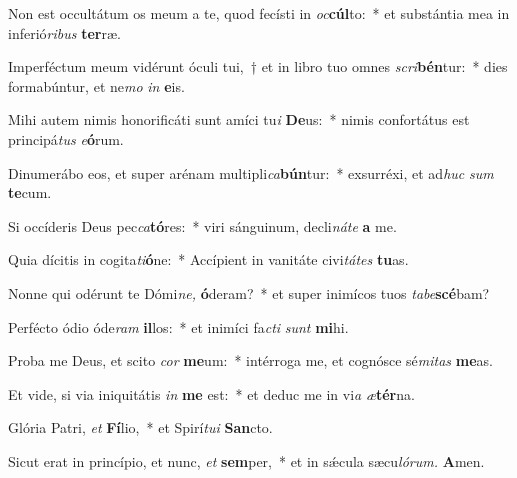 \item Non est occultátum os meum a te, quod fecísti in \textit{oc}\textbf{cúl}to:~* et substántia mea in inferió\textit{ribus} \textbf{ter}ræ.
\item Imperféctum meum vidérunt óculi tui,~† et in libro tuo omnes \textit{scri}\textbf{bén}tur:~* dies formabúntur, et ne\textit{mo} \textit{in} \textbf{e}is.
\item Mihi autem nimis honorificáti sunt amíci tu\hspace{0.03em}\textit{i} \textbf{De}us:~* nimis confortátus est principá\hspace{0.03em}\textit{tus} \textit{e}\textbf{ó}rum.
\item Dinumerábo eos, et super arénam multipli\hspace{0.03em}\textit{ca}\textbf{bún}tur:~* exsurréxi, et ad\textit{huc} \textit{sum} \textbf{te}cum.
\item Si occíderis Deus pec\textit{ca}\textbf{tó}res:~* viri sánguinum, decli\textit{náte} \textbf{a} me.
\item Quia dícitis in cogita\hspace{0.03em}\textit{ti}\textbf{ó}ne:~* Accípient in vanitáte civi\textit{tátes} \textbf{tu}as.
\item Nonne qui odérunt te Dómi\textit{ne,} \textbf{ó}deram?~* et super inimícos tuos \textit{tabe}\textbf{scé}bam?
\item Perfécto ódio óde\textit{ram} \textbf{il}los:~* et inimíci fa\hspace{0.03em}\textit{cti} \textit{sunt} \textbf{mi}hi.
\item Proba me Deus, et scito \textit{cor} \textbf{me}um:~* intérroga me, et cognósce sé\textit{mitas} \textbf{me}as.
\item Et vide, si via iniquitátis \textit{in} \textbf{me} est:~* et deduc me in vi\hspace{0.03em}\textit{a} \textit{æ}\textbf{tér}na.
\item Glória Patri, \textit{et} \textbf{Fí}lio,~* et Spirí\hspace{0.03em}\textit{tui} \textbf{San}cto.
\item Sicut erat in princípio, et nunc, \textit{et} \textbf{sem}per,~* et in sǽcula sæcu\hspace{0.03em}\textit{lórum.} \textbf{A}men.
